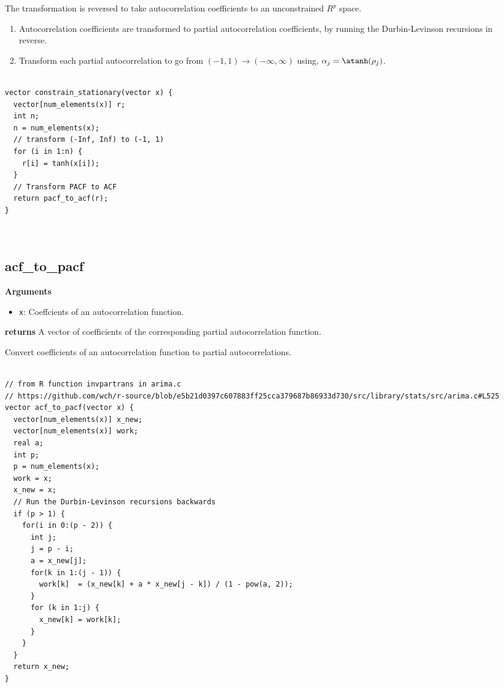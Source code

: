 \documentclass[]{book}
\providecommand{\tightlist}{%
  \setlength{\itemsep}{0pt}\setlength{\parskip}{0pt}}
\begin{document}
The transformation is reversed to take autocorrelation coefficients to
an unconstrained \(R^p\) space.

\begin{enumerate}
\def\labelenumi{\arabic{enumi}.}
\tightlist
\item
  Autocorrelation coefficients are transformed to partial
  autocorrelation coefficients, by running the Durbin-Levinson
  recursions in reverse.
\item
  Transform each partial autocorrelation to go from
  \((-1, 1) \to (-\infty, \infty)\) using,
  \(\alpha_j = \atanh(\rho_j)\).
\end{enumerate}

\begin{verbatim}

vector constrain_stationary(vector x) {
  vector[num_elements(x)] r;
  int n;
  n = num_elements(x);
  // transform (-Inf, Inf) to (-1, 1)
  for (i in 1:n) {
    r[i] = tanh(x[i]);
  }
  // Transform PACF to ACF
  return pacf_to_acf(r);
}



\end{verbatim}

\subsection{acf\_to\_pacf}\label{acf_to_pacf}

\textbf{Arguments}

\begin{itemize}
\tightlist
\item
  \texttt{x}: Coeffcients of an autocorrelation function.
\end{itemize}

\textbf{returns} A vector of coefficients of the corresponding partial
autocorrelation function.

Convert coefficients of an autocorrelation function to partial
autocorrelations.

\begin{verbatim}

// from R function invpartrans in arima.c
// https://github.com/wch/r-source/blob/e5b21d0397c607883ff25cca379687b86933d730/src/library/stats/src/arima.c#L525
vector acf_to_pacf(vector x) {
  vector[num_elements(x)] x_new;
  vector[num_elements(x)] work;
  real a;
  int p;
  p = num_elements(x);
  work = x;
  x_new = x;
  // Run the Durbin-Levinson recursions backwards
  if (p > 1) {
    for(i in 0:(p - 2)) {
      int j;
      j = p - i;
      a = x_new[j];
      for(k in 1:(j - 1)) {
        work[k]  = (x_new[k] + a * x_new[j - k]) / (1 - pow(a, 2));
      }
      for (k in 1:j) {
        x_new[k] = work[k];
      }
    }
  }
  return x_new;
}

\end{verbatim}
\end{document}

